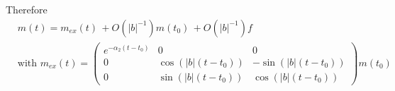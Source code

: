 \documentclass{ws-m3as}
\def\pp{p_{\perp\!\!\!\!\!\bigcirc}}
\def\bb{b}
\begin{document}
Therefore 
\begin{equation}\label{mtexplicit}
\begin{aligned}
&m(t)=m_{ex}(t)\,+O(|\bb|^{-1})m(t_0)\, +O(|\bb|^{-1})f\\
&\text{with }m_{ex}(t)=\left(\begin{array}{ccc}
e^{-\alpha_2(t-t_0)}&0&0\\ 
0&\cos(|\bb|(t-t_0))&-\sin(|\bb|(t-t_0))\\ 
0&\sin(|\bb|(t-t_0))&\cos(|\bb|(t-t_0))
\end{array}\right)m(t_0)
\end{aligned}
\end{equation}
\end{document}

